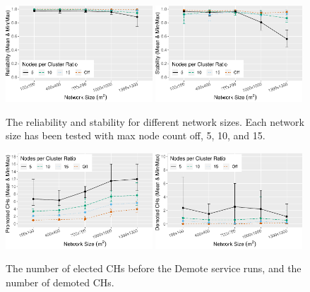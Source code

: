\begin{figure}[bt]
    \centering
    \includegraphics[width=0.49\textwidth, keepaspectratio]{figure/Results/ParameterEvaluation/MaxNodeCount_Reliability.pdf}
    \includegraphics[width=0.49\textwidth, keepaspectratio]{figure/Results/ParameterEvaluation/MaxNodeCount_Stability.pdf}
    \caption{The reliability and stability for different network sizes. Each network size has been tested with max node count off, 5, 10, and 15.}
    \label{fig:nodes-per-cluster-ratio-reliability}

    \centering
    \includegraphics[width=0.49\textwidth, keepaspectratio]{figure/Results/ParameterEvaluation/MaxNodeCount_PromotedCHCount.pdf}
    \includegraphics[width=0.49\textwidth, keepaspectratio]{figure/Results/ParameterEvaluation/MaxNodeCount_DemotedCHCount.pdf}
    \caption{The number of elected CHs before the Demote service runs, and the number of demoted CHs.}
    \label{fig:nodes-per-cluster-ratio-promoted-ch-count}
\end{figure}

